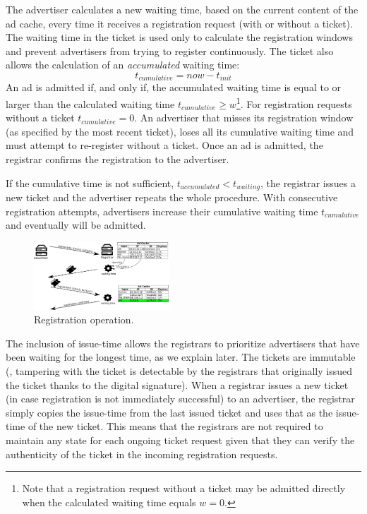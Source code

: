 The advertiser  calculates a new waiting time, based on the current content of
the ad cache, every time it receives a registration request (with or without
a ticket). The waiting time in the ticket is used only to calculate the
registration windows and prevent advertisers from trying to register
continuously. The ticket also allows the calculation of an \emph{accumulated} waiting time:
\begin{equation}
    t_\textit{cumulative} = \textit{now} - t_\textit{init}
\end{equation}
An ad is admitted if, and only if, the accumulated waiting time is equal to or larger than the calculated waiting time $t_\textit{cumulative} \ge w$\footnote{Note that a registration request without a ticket may be admitted directly when the calculated waiting time equals $w=0$.}. 
For registration requests without a ticket $t_\textit{cumulative} = 0$. An advertiser that misses its registration window (as specified by the most recent ticket), loses all its cumulative waiting time and must attempt to re-register without a ticket. Once an ad is admitted, the registrar confirms the registration to the advertiser.

If the cumulative time is not sufficient, $t_\textit{accumulated} < t_\textit{waiting}$, the registrar issues a new ticket and the advertiser repeats the whole procedure.
With consecutive registration attempts, advertisers increase their cumulative waiting time $t_\textit{cumulative}$ and eventually will be admitted. 


\begin{figure}
    \includegraphics[width=0.45\textwidth]{img/registration}
    \vspace{-0.15in}
    \caption{Registration operation.}
    \label{fig:registration}
    \vspace{-0.15in}
\end{figure}

The inclusion of issue-time allows the registrars to prioritize advertisers that have been waiting for the longest time, as we explain later. The tickets are immutable (\ie, tampering with the ticket is detectable by the registrars that originally issued the ticket thanks to the digital signature). When a registrar issues a new ticket (in case registration is not immediately successful) to an advertiser, the registrar simply copies the issue-time from the last issued ticket and uses that as the issue-time of the new ticket. This means that the registrars are not required to maintain any state for each ongoing ticket request given that they can verify the authenticity of the ticket in the incoming registration requests.




